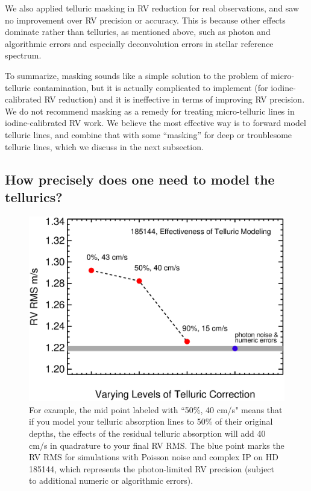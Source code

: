 We also applied telluric masking in RV reduction for real
observations, and saw no improvement over RV precision or
accuracy. This is because other effects dominate rather than
tellurics, as mentioned above, such as photon and algorithmic errors
and especially deconvolution errors in stellar reference spectrum.

To summarize, masking sounds like a simple solution to the problem of
micro-telluric contamination, but it is actually complicated to
implement (for iodine-calibrated RV reduction) and it is ineffective
in terms of improving RV precision. We do not recommend masking as a
remedy for treating micro-telluric lines in iodine-calibrated RV
work. We believe the most effective way is to forward model telluric
lines, and combine that with some ``masking'' for deep or troublesome
telluric lines, which we discuss in the next subsection.


\subsection{How precisely does one need to model the tellurics?}\label{sec:model}


\begin{figure}
  \centering
\includegraphics[scale=0.3]{telluric/neid.eps} 
\caption{ For example, the mid point labeled with ``50\%, 40 cm/s"
  means that if you model your telluric absorption lines to 50\% of
  their original depths, the effects of the residual telluric
  absorption will add 40 cm/s in quadrature to your final RV RMS. The
  blue point marks the RV RMS for simulations with Poisson noise and
  complex IP on HD 185144, which represents the photon-limited RV
  precision (subject to additional numeric or algorithmic errors).
\label{fig:neid}}
\end{figure}


